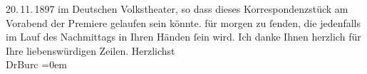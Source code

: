 \begin{ledgroupsized}[t]{13cm}
{{{                     20. 11. 1897 im
                     Deutschen Volkstheater, so dass dieses
                  Korrespondenzstück am Vorabend der Premiere gelaufen sein könnte.}}}\label{K_L00744-1h} für
               morgen zu ſenden, die jedenfalls im Lauf des Nachmittags in Ihren Händen ſein wird.
               Ich danke Ihnen herzlich für Ihre liebenswürdigen Zeilen.\pend
           \pstart
           Herzlichst{\\[\baselineskip]}\spacefill\mbox{DrBurc}\pend
           \leftskip=0em{}
         
         \endnumbering{}\end{ledgroupsized}  \newcommand{\dateiname}{L00744}\newcommand{\titel}{Max Burckhard an Arthur Schnitzler, [19. 11.? 1897]}\newcommand{\editorInnen}{Martin Anton Müller und Gerd-Hermann Susen}
      